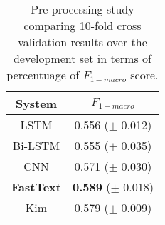 \begin{comment}
\begin{table}[h]
\footnotesize
\caption{Text representation study comparing 10-fold cross validation results over the development set in terms of percentuage of $F_{1-macro}$ score. The pre-processing setting was fixed at RM+EM.}
\centering
\begin{tabular}{l|ccccc}
\toprule
\multirow{2}{*}{Embedding}	& \multicolumn{5}{ c }{Models}       \\ 
					& CNN		& LSTM		& B-LSTM	& FAST-TEXT	& KIM	\\ 
\hline 
ES static			& \textbf{48,1}		& 36,1		& 38,9		& 36,4		& 43,6\\
CA static			& \textbf{45,1}		& 30,6		& 38,5		& 30,1		& 39,6\\ 
\hline
ES non-static		& \win57,1		& 52,1		& 49,9		& \win54,8		& \win\textbf{58,9}\\
CA non-static		& 53,5		& \win53,6		& 46,3		& 54,1		& \textbf{56,2}\\
\hline
non-static			& 52,6		& 47,3		& \win51,8		& 53,3		& \textbf{54,7}\\
\bottomrule
\end{tabular}
\end{table}
\end{comment}


\begin{table}[h]
\footnotesize
\caption{Pre-processing study comparing 10-fold cross validation results over the development set in terms of percentuage of $F_{1-macro}$ score. }
\label{tab:overview}
\centering
\begin{tabular}{c|c}
\toprule
\hline
System		& $F_{1-macro}$		\\
\hline
LSTM		& 0.556 ($\pm$ 0.012) \\
Bi-LSTM		& 0.555 ($\pm$ 0.035) \\
CNN			& 0.571 ($\pm$ 0.030) \\
\textbf{FastText}	& \textbf{0.589} ($\pm$ 0.018) \\
Kim			& 0.579 ($\pm$ 0.009) \\
\hline
\bottomrule
\end{tabular}
\end{table}
